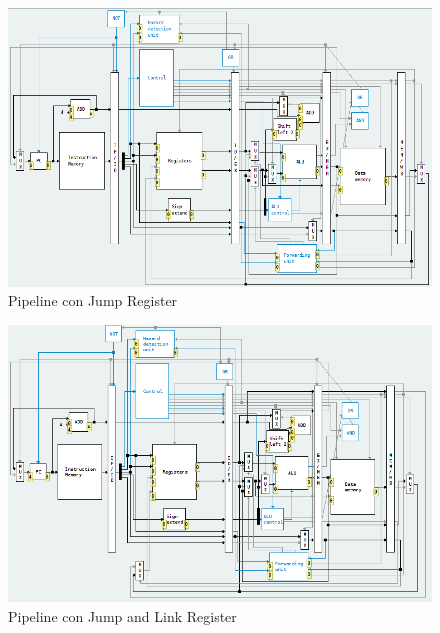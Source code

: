 \documentclass[11pt,a4paper, spanish]{article}
\begin{document}
\begin{figure}
\begin{center}
\includegraphics[width=\textwidth,height=\textheight,keepaspectratio]{img/pipeline_jr.png}
\caption{Pipeline con Jump Register}
\end{center}
\end{figure}

\begin{figure}
\begin{center}
\includegraphics[width=\textwidth,height=\textheight,keepaspectratio]{img/pipeline_jalr.png}
\caption{Pipeline con Jump and Link Register}
\end{center}
\end{figure}
\end{document}

